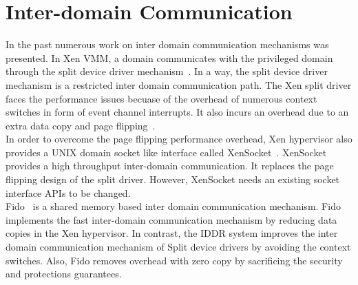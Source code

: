 \section{Inter-domain Communication}
\label{sec:interdomain}
In the past numerous work on inter domain communication mechanisms was presented. In Xen VMM, a domain communicates with the privileged domain through the split device driver mechanism~\cite{Fraser04safehardware}. In a way, the split device driver mechanism is a restricted inter domain communication path. The Xen split driver faces the performance issues becuase of the overhead of numerous context switches in form of event channel interrupts. It also incurs an overhead due to an extra data copy and page flipping~\cite{Zhang:2007:XHI:1516124.1516138}. 
\\[3mm]
In order to overcome the page flipping performance overhead, Xen hypervisor also provides a UNIX domain socket like interface called XenSocket~\cite{Zhang:2007:XHI:1516124.1516138}. XenSocket provides a high throughput inter-domain communication. It replaces the page flipping design of the split driver. However, XenSocket needs an existing socket interface APIs to be changed. 
\\[3mm]
Fido~\cite{Burtsev:2009:FFI:1855807.1855832} is a shared memory based inter domain communication mechanism. Fido implements the fast inter-domain communication mechanism by reducing data copies in the Xen hypervisor. In contrast, the IDDR system improves the inter domain communication mechanism of Split device drivers by avoiding the context switches. Also, Fido removes overhead with zero copy by sacrificing the security and protections guarantees.
\\[3mm]

